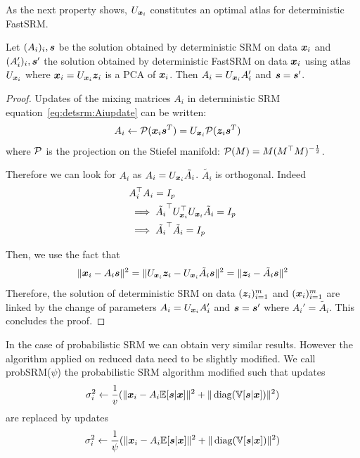 As the next property shows, $U_{\boldsymbol{x}_i}$ constitutes an optimal atlas for deterministic FastSRM.
\begin{proposition}
  Let $(A_i)_i, \boldsymbol{s}$ be the solution obtained by deterministic SRM on data
  $\boldsymbol{x}_i$ and $(A_i')_i, \boldsymbol{s}'$ the solution obtained by deterministic FastSRM on
  data $\boldsymbol{x}_i$ using atlas $U_{\boldsymbol{x}_i}$ where $\boldsymbol{x}_i = U_{\boldsymbol{x}_i} \boldsymbol{z}_i$ is a PCA
  of $\boldsymbol{x}_i$. Then $A_i = U_{\boldsymbol{x}_i}A_i'$ and $\boldsymbol{s} = \boldsymbol{s}'$. 
\label{prop:optimaldetsrm}
\end{proposition}
\begin{proof}
Updates of the mixing matrices $A_i$ in deterministic SRM
equation~\eqref{eq:detsrm:Aiupdate} can be written:
\begin{align}
  A_i &\leftarrow \mathcal{P}(\boldsymbol{x}_i \boldsymbol{s}^T)= U_{\boldsymbol{x}_i}\mathcal{P}(\boldsymbol{z}_i \boldsymbol{s}^T)
  \label{eq:fastdetsrm:Aiupdate}
\end{align}
where $\mathcal{P}$ is the projection on the Stiefel manifold: $\mathcal{P}(M) = M
(M^{\top}M)^{-\frac12}$.


Therefore we can look for $A_i$ as $A_i = U_{\boldsymbol{x}_i} \tilde{A_i}$. $\tilde{A_i}$ is
orthogonal. Indeed
\begin{align}
  &A_i^{\top} A_i = I_p \\
  & \implies \tilde{A_i}^{\top}U_{\boldsymbol{x}_i}^{\top} U_{\boldsymbol{x}_i} \tilde{A_i} = I_p \\
  & \implies \tilde{A_i}^{\top} \tilde{A_i} = I_p
\end{align}

Then, we use the fact that
\begin{align}
  \|\boldsymbol{x}_i - A_i \boldsymbol{s} \|^2 = \| U_{\boldsymbol{x}_i}\boldsymbol{z}_i - U_{\boldsymbol{x}_i}\tilde{A_i} \boldsymbol{s}\|^2 = \| \boldsymbol{z}_i - \tilde{A_i} \boldsymbol{s} \|^2
  \label{eq:equality:xy}
\end{align}
Therefore, the solution of deterministic SRM on data $(\boldsymbol{z}_i)_{i=1}^m$ and
$(\boldsymbol{x}_i)_{i=1}^m$ are linked by the change of parameters $A_i = U_{\boldsymbol{x}_i}A_i'$ and
$\boldsymbol{s} = \boldsymbol{s}'$ where $A_i' = \tilde{A_i}$. This concludes the proof.
\end{proof}

In the case of probabilistic SRM we can obtain very similar results. However the
algorithm applied on reduced data need to be slightly modified.
We call probSRM($\psi$) the probabilistic SRM algorithm modified such that
updates
\begin{align}
\sigma_i^2 \leftarrow \frac1{v} (\| \boldsymbol{x}_i - A_i \mathbb{E}[\boldsymbol{s}|\boldsymbol{x}]\|^2 + \| \operatorname*{diag}(\mathbb{V}[\boldsymbol{s} | \boldsymbol{x}]) \|^2)
\end{align}
are replaced by updates
\begin{align}
  \sigma_i^2 \leftarrow \frac1{\psi} (\| \boldsymbol{x}_i - A_i \mathbb{E}[\boldsymbol{s}|\boldsymbol{x}]\|^2 + \| \operatorname*{diag}(\mathbb{V}[\boldsymbol{s} | \boldsymbol{x}]) \|^2)
\end{align}


